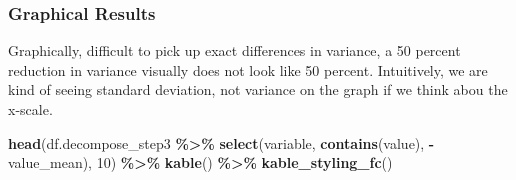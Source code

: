 \documentclass[
]{book}
\newenvironment{Shaded}{\begin{snugshade}}{\end{snugshade}}
\newcommand{\DecValTok}[1]{\textcolor[rgb]{0.00,0.00,0.81}{#1}}
\newcommand{\KeywordTok}[1]{\textcolor[rgb]{0.13,0.29,0.53}{\textbf{#1}}}
\newcommand{\NormalTok}[1]{#1}
\newcommand{\OperatorTok}[1]{\textcolor[rgb]{0.81,0.36,0.00}{\textbf{#1}}}
\newcommand{\StringTok}[1]{\textcolor[rgb]{0.31,0.60,0.02}{#1}}
\begin{document}
\begin{table}[!h]
\centering
{}
\end{table}

\hypertarget{graphical-results}{%
\subsubsection{Graphical Results}\label{graphical-results}}

Graphically, difficult to pick up exact differences in variance, a 50 percent reduction in variance visually does not look like 50 percent. Intuitively, we are kind of seeing standard deviation, not variance on the graph if we think abou the x-scale.

\begin{Shaded}
\begin{Highlighting}[]
\KeywordTok{head}\NormalTok{(df.decompose\_step3 }\OperatorTok{\%\textgreater{}\%}
\StringTok{    }\KeywordTok{select}\NormalTok{(variable, }\KeywordTok{contains}\NormalTok{(}\StringTok{\textquotesingle{}value\textquotesingle{}}\NormalTok{), }\OperatorTok{{-}}\NormalTok{value\_mean), }\DecValTok{10}\NormalTok{) }\OperatorTok{\%\textgreater{}\%}
\StringTok{  }\KeywordTok{kable}\NormalTok{() }\OperatorTok{\%\textgreater{}\%}
\StringTok{  }\KeywordTok{kable\_styling\_fc}\NormalTok{()}
\end{Highlighting}
\end{Shaded}
\end{document}

